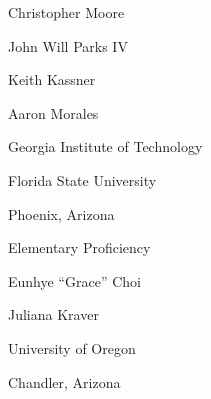 \begin{minipage}[t]{0.2\textwidth}
	\flushleft
\end{minipage}
\begin{minipage}[t]{0.75\textwidth}
	{
		\begin{minipage}[t]{0.30\textwidth}
			Christopher Moore

			John Will Parks IV

			Keith Kassner

			Aaron Morales
		\end{minipage}
		\begin{minipage}[t]{0.20\textwidth}
		\end{minipage}
		\begin{minipage}[t]{0.63\textwidth}
			\hfill Georgia Institute of Technology

			\hfill Florida State University

			\hfill Phoenix, Arizona

			\hfill Elementary Proficiency
		\end{minipage}
	}

	\vspace*{4pt}
	{
		\begin{minipage}[t]{0.30\textwidth}
			Eunhye ``Grace'' Choi

			Juliana Kraver
		\end{minipage}
		\begin{minipage}[t]{0.20\textwidth}
		\end{minipage}
		\begin{minipage}[t]{0.63\textwidth}
			\hfill University of Oregon

			\hfill Chandler, Arizona
		\end{minipage}
	}
\end{minipage}

\vspace{8pt}